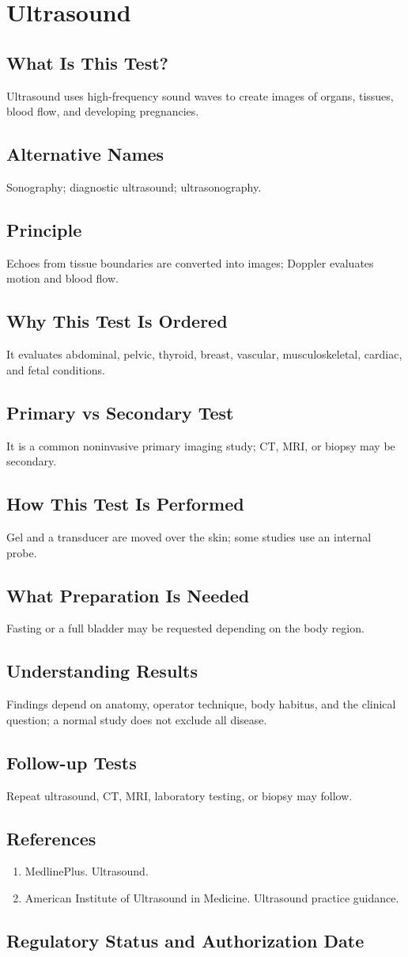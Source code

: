 \chapter{Ultrasound}
\section*{What Is This Test?} Ultrasound uses high-frequency sound waves to create images of organs, tissues, blood flow, and developing pregnancies.\section*{Alternative Names} Sonography; diagnostic ultrasound; ultrasonography.\section*{Principle} Echoes from tissue boundaries are converted into images; Doppler evaluates motion and blood flow.\section*{Why This Test Is Ordered} It evaluates abdominal, pelvic, thyroid, breast, vascular, musculoskeletal, cardiac, and fetal conditions.\section*{Primary vs Secondary Test} It is a common noninvasive primary imaging study; CT, MRI, or biopsy may be secondary.\section*{How This Test Is Performed} Gel and a transducer are moved over the skin; some studies use an internal probe.\section*{What Preparation Is Needed} Fasting or a full bladder may be requested depending on the body region.\section*{Understanding Results} Findings depend on anatomy, operator technique, body habitus, and the clinical question; a normal study does not exclude all disease.\section*{Follow-up Tests} Repeat ultrasound, CT, MRI, laboratory testing, or biopsy may follow.\section*{References} \begin{enumerate}\item MedlinePlus. Ultrasound.\item American Institute of Ultrasound in Medicine. Ultrasound practice guidance.\end{enumerate}\clearpage\section*{Regulatory Status and Authorization Date}\clearpage
